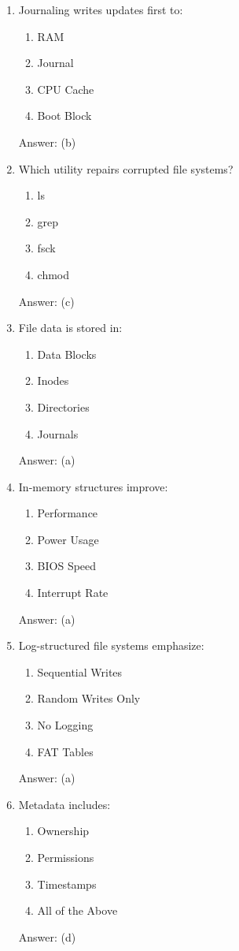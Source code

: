 \begin{enumerate}
\item Journaling writes updates first to:
\begin{enumerate}[label=(\alph*)]
\item RAM
\item Journal
\item CPU Cache
\item Boot Block
\end{enumerate}
Answer: (b)

\item Which utility repairs corrupted file systems?
\begin{enumerate}[label=(\alph*)]
\item ls
\item grep
\item fsck
\item chmod
\end{enumerate}
Answer: (c)

\item File data is stored in:
\begin{enumerate}[label=(\alph*)]
\item Data Blocks
\item Inodes
\item Directories
\item Journals
\end{enumerate}
Answer: (a)

\item In-memory structures improve:
\begin{enumerate}[label=(\alph*)]
\item Performance
\item Power Usage
\item BIOS Speed
\item Interrupt Rate
\end{enumerate}
Answer: (a)

\item Log-structured file systems emphasize:
\begin{enumerate}[label=(\alph*)]
\item Sequential Writes
\item Random Writes Only
\item No Logging
\item FAT Tables
\end{enumerate}
Answer: (a)

\item Metadata includes:
\begin{enumerate}[label=(\alph*)]
\item Ownership
\item Permissions
\item Timestamps
\item All of the Above
\end{enumerate}
Answer: (d)


\end{enumerate}
